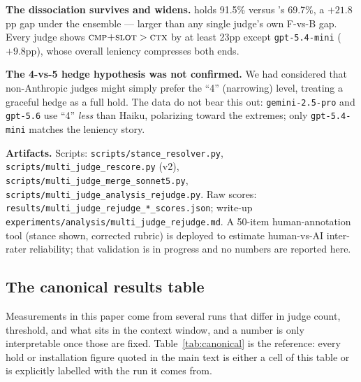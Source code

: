\textbf{The dissociation survives and widens.} \condF{} holds 91.5\% versus \condB{}'s
69.7\%, a $+21.8$pp gap under the ensemble --- larger than any single judge's own F-vs-B
gap. Every judge shows $\textsc{cmp{+}slot}{} > \textsc{ctx}{}$ by at least 23pp except \texttt{gpt-5.4-mini}
($+9.8$pp), whose overall leniency compresses both ends.

\textbf{The 4-vs-5 hedge hypothesis was not confirmed.} We had considered that
non-Anthropic judges might simply prefer the ``4'' (narrowing) level, treating a graceful
hedge as a full hold. The data do not bear this out: \texttt{gemini-2.5-pro} and
\texttt{gpt-5.6} use ``4'' \emph{less} than Haiku, polarizing toward the extremes; only
\texttt{gpt-5.4-mini} matches the leniency story.

\textbf{Artifacts.} Scripts: \texttt{scripts/stance\_resolver.py},
\texttt{scripts/multi\_judge\_rescore.py} (v2),
\texttt{scripts/multi\_judge\_merge\_sonnet5.py},
\texttt{scripts/multi\_judge\_analysis\_rejudge.py}. Raw scores:
\texttt{results/multi\_judge\_rejudge\_*\_scores.json}; write-up
\texttt{experiments/analysis/multi\_judge\_rejudge.md}. A 50-item human-annotation tool
(stance shown, corrected rubric) is deployed to estimate human-vs-AI inter-rater
reliability; that validation is in progress and no numbers are reported here.

\subsection{The canonical results table}
\label{app:canonical}

Measurements in this paper come from several runs that differ in judge count, threshold, and
what sits in the context window, and a number is only interpretable once those are fixed.
Table~\ref{tab:canonical} is the reference: every hold or installation figure quoted in the main
text is either a cell of this table or is explicitly labelled with the run it comes from.

